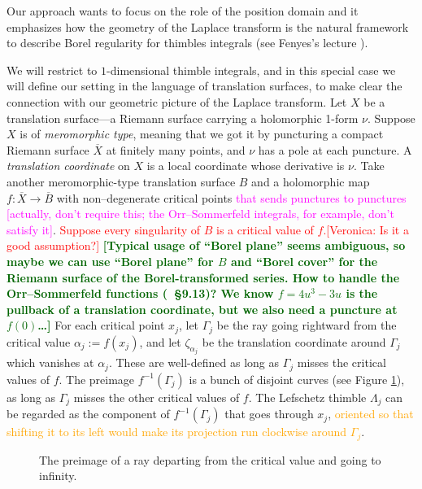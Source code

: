 \documentclass{article}
\theoremstyle{definition}
\newcommand{\maps}{\colon}
\begin{document}
Our approach wants to focus on the role of the position domain and it emphasizes how the geometry of the Laplace transform is the natural framework to describe Borel regularity for thimbles integrals (see Fenyes's lecture \cite{Fenyes-ihes-lecture}).  

We will restrict to $1$-dimensional thimble integrals, and in this special case we will define our setting in the language of translation surfaces, to make clear the connection with our geometric picture of the Laplace transform. 
\color{DarkBlue}
Let $X$ be a translation surface---a Riemann surface carrying a holomorphic 1-form $\nu$. Suppose $X$ is of {\em meromorphic type}, meaning that we got it by puncturing a compact Riemann surface $\overline{X}$ at finitely many points, and $\nu$ has a pole at each puncture. A {\em translation coordinate} on $X$ is a local coordinate whose derivative is $\nu$. Take another meromorphic-type translation surface $B$ and a holomorphic map $f \maps \overline{X} \to \overline{B}$ with non--degenerate critical points \textcolor{magenta}{that sends punctures to punctures [actually, don't require this; the Orr--Sommerfeld integrals, for example, don't satisfy it]}. \textcolor{red}{Suppose every singularity of $B$ is a critical value of $f$.[Veronica: Is it a good assumption?]} \textcolor{DarkGreen}{\textbf{[Typical usage of ``Borel plane'' seems ambiguous, so maybe we can use ``Borel plane'' for $B$ and ``Borel cover'' for the Riemann surface of the Borel-transformed series. How to handle the Orr–Sommerfeld functions (\cite{dlmf}~\S 9.13)? We know $f = 4u^3 - 3u$ is the pullback of a translation coordinate, but we also need a puncture at $f(0)$\ldots]}} 
\color{black}
For each critical point $x_j$, let $\Gamma_j$ be the ray going rightward from the critical value $\alpha_j:=f(x_j)$, and let $\zeta_{\alpha_j}$ be the translation coordinate around $\Gamma_j$ which vanishes at $\alpha_j$. These are well-defined as long as $\Gamma_j$ misses the critical values of $f$. The preimage $f^{-1}(\Gamma_j)$ is a bunch of disjoint curves (see Figure \ref{fig:thimble_vs_rays}), as long as $\Gamma_j$ misses the other critical values of $f$. The Lefschetz thimble  $\Lambda_j$ can be regarded as the component of $f^{-1}(\Gamma_j)$ that goes through $x_j$, \textcolor{orange}{oriented so that shifting it to its left would make its projection run clockwise around $\Gamma_j$}. 

\begin{figure}[h]
    \centering
    \caption{The preimage of a ray departing from the critical value and going to infinity.}
    \label{fig:thimble_vs_rays}
\end{figure}
\end{document}
